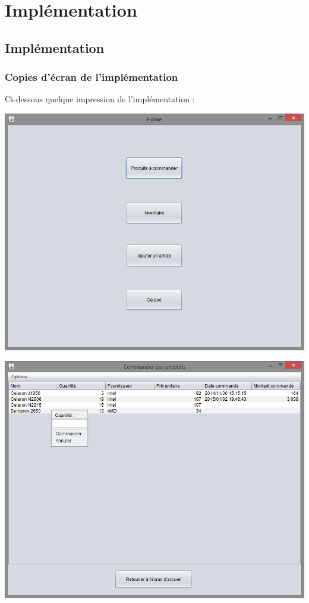 \part{Implémentation}

\chapter{Implémentation}

\section{Copies d'écran de l'implémentation}
Ci-dessous quelque impression de l'implémentation :

\begin{center}
	\includegraphics[width=14cm]{./Implementation/home}
\end{center}

\begin{center}
	\includegraphics[width=14cm]{./Implementation/acommander}
\end{center}

